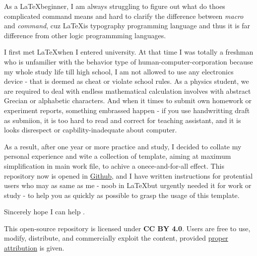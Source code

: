     As a \LaTeX beginner, I am always struggling  to figure out what do thoes complicated command means and hard to clarify the difference between \emph{macro} and \emph{command}, cuz \LaTeX is typography programming language and thus it is far difference from other logic programmming languages. 

    I first met \LaTeX when I entered university. At that time I was totally a freshman who is unfamilier with the behavior type of human-computer-corporation because my whole study life till high school, I am not allowed to use any electronics device - that is deemed as cheat or violate school rules. As a physics student, we are required to deal with endless mathematical calculation involves with abstract Grecian or alphabetic characters. And when it times to submit own homework or experiment reports, something embrassed happen - if you use handwritting draft as submiion, it is too hard to read and correct for teaching assistant, and it is looks disrespect or capbility-inadequate about computer. 
    
    As a result, after one year or more practice and study, I decided to collate my personal experience and wite a collection of template, aiming at maximum simplification in main work file, to achive a onece-and-for-all effect. This repository now is opened in \href{https://github.com/SweetPastry/spTemplate}{Github}, and I have written instructions for protential users who may as same as me - noob in \LaTeX but urgently needed it for work or study - to help you as quickly as possible to grasp the usage of this template.

    Sincerely hope I can help .
    
    This open-source repository is licensed under \textbf{CC BY 4.0}. Users are free to use, modify, distribute, and commercially exploit the content, provided \href{}{proper attribution} is given.
